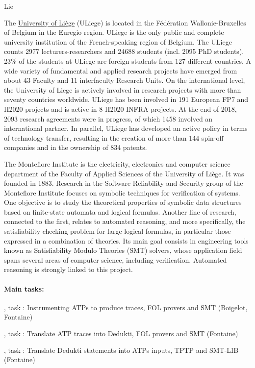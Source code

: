 \begin{sitedescription}{Lie}


The \href{http://www.uliege.be}{University of Liège} (ULiege) is located in the Fédération Wallonie-Bruxelles of Belgium in the Euregio region. ULiege is the only public and complete university institution of the French-speaking region of Belgium. The ULiege counts 2977 lecturers-researchers and 24688 students (incl. 2095 PhD students). 23\% of the students at ULiege are foreign students from 127 different countries. A wide variety of fundamental and applied research projects have emerged from about 43 Faculty and 11 interfaculty Research Units. On the international level, the University of Liege is actively involved in research projects with more than seventy countries worldwide. ULiege has been involved in 191 European FP7 and H2020 projects and is active in 8 H2020 INFRA projects. At the end of 2018, 2093 research agreements were in progress, of which 1458 involved an international partner. In parallel, ULiege has developed an active policy in terms of technology transfer, resulting in the creation of more than 144 spin-off companies and in the ownership of 834 patents.

The Montefiore Institute is the electricity, electronics and computer science
department of the Faculty of Applied Sciences of the University of Liège.  It
was founded in 1883.  Research in the Software Reliability and Security group of
the Montefiore Institute focuses on symbolic techniques for verification of
systems.  One objective is to study the theoretical properties of symbolic data
structures based on finite-state automata and logical formulas.  Another line of
research, connected to the first, relates to automated reasoning, and more
specifically, the satisfiability checking problem for large logical formulas, in
particular those expressed in a combination of theories.  Its main goal consists
in engineering tools known as Satisfiability Modulo Theories (SMT) solvers,
whose application field spans several areas of computer science, including
verification.  Automated reasoning is strongly linked to this project.

\paragraph*{Main tasks:}

\begin{compactitem}
\item {}, task : Instrumenting ATPs to produce traces, FOL provers and SMT (Boigelot, Fontaine)
\item  {}, task : Translate ATP traces into Dedukti, FOL provers and SMT (Fontaine)
\item {}, task : Translate Dedukti statements into ATPs inputs, TPTP and SMT-LIB (Fontaine)
\end{compactitem}


\end{sitedescription}
